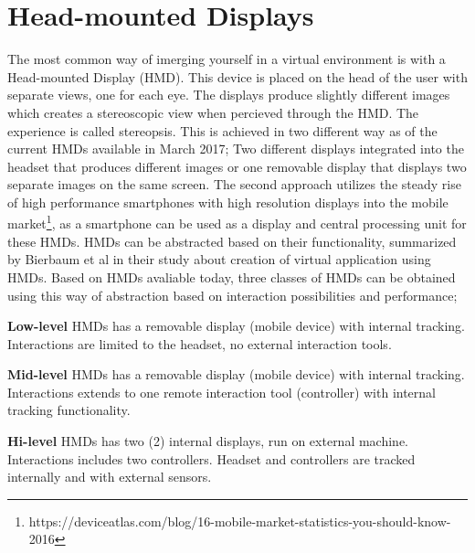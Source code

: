 \section{Head-mounted Displays}
The most common way of imerging yourself in a virtual environment is with a Head-mounted Display (HMD). This device is placed on the head of the user with separate views, one for each eye. The displays produce slightly different images which creates a stereoscopic view when percieved through the HMD. The experience is called stereopsis\cite{HMD:goldstein2016sensation}. This is achieved in two different way as of the current HMDs available in March 2017; Two different displays integrated into the headset that produces different images or one removable display that displays two separate images on the same screen. The second approach utilizes the steady rise of high performance smartphones with high resolution displays into the mobile market\footnote{https://deviceatlas.com/blog/16-mobile-market-statistics-you-should-know-2016}, as a smartphone can be used as a display and central processing unit for these HMDs.
HMDs can be abstracted based on their functionality, summarized by Bierbaum et al in their study about creation of virtual application using HMDs\cite{HMD:bierbaum2001vr}. Based on HMDs avaliable today, three classes of HMDs can be obtained using this way of abstraction based on interaction possibilities and performance;

\textbf{Low-level} HMDs has a removable display (mobile device) with internal tracking. Interactions are limited to the headset, no external interaction tools.

\textbf{Mid-level} HMDs has a removable display (mobile device) with internal tracking. Interactions extends to one remote interaction tool (controller) with internal tracking functionality.

\textbf{Hi-level} HMDs has two (2) internal displays, run on external machine. Interactions includes two controllers. Headset and controllers are tracked internally and with external sensors.
